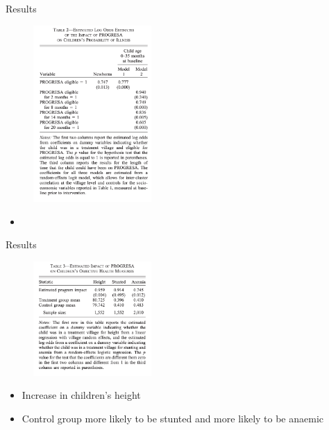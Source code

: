 \documentclass[11pt,notes=hide,aspectratio=169,mathserif]{beamer}
\begin{document}
\begin{frame}{Results}
\begin{figure}
\centering
\includegraphics[width=0.4\textwidth]{inputs/table2.png}
\end{figure}
\begin{itemize}
\item 
\end{itemize}
\end{frame}

\begin{frame}{Results}
\begin{figure}
\centering
\includegraphics[width=0.4\textwidth]{inputs/table3.png}
\end{figure}
\begin{itemize}
\item Increase in children's height 
\item Control group more likely to be stunted and more likely to be anaemic 
\end{itemize}
\end{frame}
\end{document}
